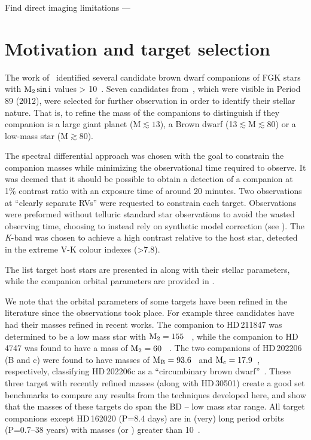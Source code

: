 Find direct imaging limitations ---


\section{Motivation and target selection}
\label{sec:motivation}
The work of~\citet{sahlmann_search_2011} identified several candidate brown dwarf companions of FGK stars with \(\rm M_2 \sin{i}\) values > 10~\Mjup{}. Seven candidates from~\citet{sahlmann_search_2011}, which were visible in Period 89 (2012), were selected for further observation in order to identify their stellar nature. That is, to refine the mass of the companions to distinguish if they companion is a large giant planet (M$\apprle13$\Mjup), a Brown dwarf (13$\apprle $M$\apprle80$\Mjup) or a low-mass star (M$\apprge80$\Mjup).

The spectral differential approach was chosen with the goal to constrain the companion masses while minimizing the observational time required to observe. It was deemed that it should be possible to obtain a detection of a companion at 1\% contrast ratio with an exposure time of around 20 minutes. Two observations at ``clearly separate RVs'' were requested to constrain each target. Observations were preformed without telluric standard star observations to avoid the wasted observing time, choosing to instead rely on synthetic model correction (see ). The \textit{K}-band was chosen to achieve a high contrast relative to the host star, detected in the extreme V-K colour indexes (>7.8).

The list target host stars are presented in  along with their stellar parameters, while the companion orbital parameters are provided in .

We note that the orbital parameters of some targets have been refined in the literature since the observations took place. For example three candidates have had their masses refined in recent works. The companion to {HD\,211847} was determined to be a low mass star with \(\rm M_2=155~\)\Mjup{}~\citep{moutou_eccentricity_2017}, while the companion to {HD\,4747} was found to have a mass of \(\rm M_2=60~\)\Mjup{}~\citep{crepp_trends_2016}. The two companions of {HD\,202206} (B and c) were found to have masses of \(\rm M_B =93.6\)~\Mjup{} and \(\rm M_c = 17.9\)~\Mjup{}, respectively, classifying {HD\,202206}c as a ``circumbinary brown dwarf''~\citep{benedict_hd_2017}. These three target with recently refined masses (along with {HD\,30501}) create a good set benchmarks to compare any results from the techniques developed here, and show that the masses of these targets do span the BD -- low mass star range. All target companions except {HD\,162020} (P=8.4 days) are in (very) long period orbits (P=0.7--38 years) with masses (or \mtwosini{}) greater than 10~\Mjup{}.


